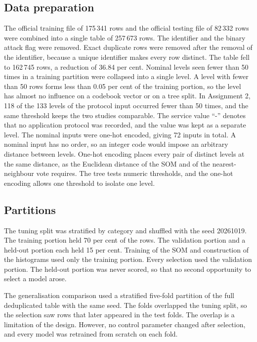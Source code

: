 \documentclass[conference,10pt]{IEEEtran}
\begin{document}
\subsection{Data preparation}
The official training file of 175\,341 rows and the official testing file of 82\,332 rows were combined into a single table of 257\,673 rows.
The identifier and the binary attack flag were removed.
Exact duplicate rows were removed after the removal of the identifier, because a unique identifier makes every row distinct.
The table fell to 162\,745 rows, a reduction of 36.84 per cent.
Nominal levels seen fewer than 50 times in a training partition were collapsed into a single level.
A level with fewer than 50 rows forms less than 0.05 per cent of the training portion, so the level has almost no influence on a codebook vector or on a tree split.
In Assignment 2, 118 of the 133 levels of the protocol input occurred fewer than 50 times, and the same threshold keeps the two studies comparable.
The service value ``-'' denotes that no application protocol was recorded, and the value was kept as a separate level.
The nominal inputs were one-hot encoded, giving 72 inputs in total.
A nominal input has no order, so an integer code would impose an arbitrary distance between levels.
One-hot encoding places every pair of distinct levels at the same distance, as the Euclidean distance of the SOM and of the nearest-neighbour vote requires.
The tree tests numeric thresholds, and the one-hot encoding allows one threshold to isolate one level.

\subsection{Partitions}
The tuning split was stratified by category and shuffled with the seed 20261019.
The training portion held 70 per cent of the rows.
The validation portion and a held-out portion each held 15 per cent.
Training of the SOM and construction of the histograms used only the training portion.
Every selection used the validation portion.
The held-out portion was never scored, so that no second opportunity to select a model arose.

The generalisation comparison used a stratified five-fold partition of the full deduplicated table with the same seed.
The folds overlapped the tuning split, so the selection saw rows that later appeared in the test folds.
The overlap is a limitation of the design.
However, no control parameter changed after selection, and every model was retrained from scratch on each fold.
\end{document}
